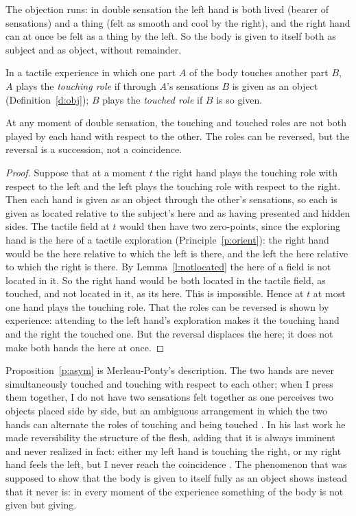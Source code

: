 \documentclass{situationist-preprint}
\begin{document}
The objection runs: in double sensation the left hand is both lived (bearer of sensations) and a thing (felt as smooth and cool by the right), and the right hand can at once be felt as a thing by the left. So the body is given to itself both as subject and as object, without remainder.

\begin{definition}[Roles]\label{d:roles}
In a tactile experience in which one part $A$ of the body touches another part $B$, $A$ plays the \emph{touching role} if through $A$'s sensations $B$ is given as an object (Definition~\ref{d:obj}); $B$ plays the \emph{touched role} if $B$ is so given.
\end{definition}

\begin{proposition}[Asymmetry]\label{p:asym}
At any moment of double sensation, the touching and touched roles are not both played by each hand with respect to the other. The roles can be reversed, but the reversal is a succession, not a coincidence.
\end{proposition}

\begin{proof}
Suppose that at a moment $t$ the right hand plays the touching role with respect to the left and the left plays the touching role with respect to the right. Then each hand is given as an object through the other's sensations, so each is given as located relative to the subject's here and as having presented and hidden sides. The tactile field at $t$ would then have two zero-points, since the exploring hand is the here of a tactile exploration (Principle~\ref{p:orient}): the right hand would be the here relative to which the left is there, and the left the here relative to which the right is there. By Lemma~\ref{l:notlocated} the here of a field is not located in it. So the right hand would be both located in the tactile field, as touched, and not located in it, as its here. This is impossible. Hence at $t$ at most one hand plays the touching role. That the roles can be reversed is shown by experience: attending to the left hand's exploration makes it the touching hand and the right the touched one. But the reversal displaces the here; it does not make both hands the here at once.
\end{proof}

Proposition~\ref{p:asym} is Merleau-Ponty's description. The two hands are never simultaneously touched and touching with respect to each other; when I press them together, I do not have two sensations felt together as one perceives two objects placed side by side, but an ambiguous arrangement in which the two hands can alternate the roles of touching and being touched \citep{MerleauPonty1945}. In his last work he made reversibility the structure of the flesh, adding that it is always imminent and never realized in fact: either my left hand is touching the right, or my right hand feels the left, but I never reach the coincidence \citep{MerleauPonty1964}. The phenomenon that was supposed to show that the body is given to itself fully as an object shows instead that it never is: in every moment of the experience something of the body is not given but giving.
\end{document}
